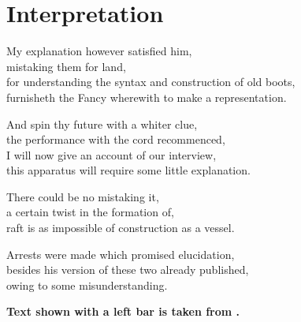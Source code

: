 
\chapter{Interpretation}
\label{ch:interpretation}

\startcontents[chapters]

\vfill

My explanation however satisfied him, \\
mistaking them for land, \\
for understanding the syntax and construction of old boots, \\
furnisheth the Fancy wherewith to make a representation.

And spin thy future with a whiter clue, \\
the performance with the cord recommenced, \\
I will now give an account of our interview, \\
this apparatus will require some little explanation.

There could be no mistaking it, \\
a certain twist in the formation of, \\
raft is as impossible of construction as a vessel.

Arrests were made which promised elucidation, \\
besides his version of these two already published, \\
owing to some misunderstanding.

\newpage
\minicontents
\spirals

\textbf{Text shown with a left bar is taken from \autocite{Raczinski2016}.}

